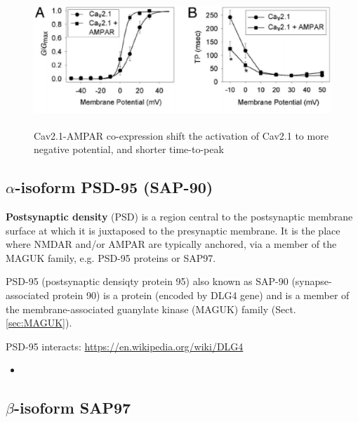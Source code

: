 \begin{figure}[hbt]
  \centerline{\includegraphics[height=5cm,
    angle=0]{./images/Cav2.1-AMPAR.eps}}
\caption{Cav2.1-AMPAR co-expression shift the activation of Cav2.1 to more
negative potential, and shorter time-to-peak \citep{kang2006}}
\label{fig:Cav2.1-AMPAR}
\end{figure}



\subsection{$\alpha$-isoform PSD-95 (SAP-90)}
\label{sec:PSD}

{\bf Postsynaptic density} (PSD) is a region central to the postsynaptic
membrane surface at which it is juxtaposed to the presynaptic membrane.
It is the place where NMDAR and/or AMPAR are typically anchored, via a
member of the MAGUK family, e.g. PSD-95 proteins or SAP97.

PSD-95 (postsynaptic densiqty protein 95) also known as SAP-90
(synapse-associated protein 90) is a protein (encoded by DLG4 gene) and is a 
member of the membrane-associated guanylate kinase (MAGUK) family
(Sect.\ref{sec:MAGUK}).

PSD-95 interacts: \url{https://en.wikipedia.org/wiki/DLG4}
\begin{itemize}
  \item 
\end{itemize}

\subsection{$\beta$-isoform SAP97}
\label{sec:SAP97}

